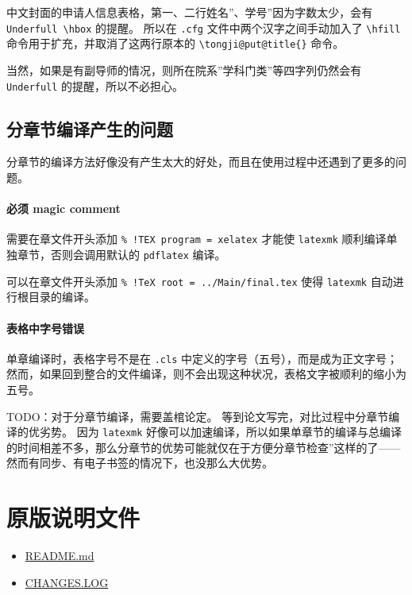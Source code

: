 \documentclass[../Main/thesis.tex]{subfiles}
\begin{document}
中文封面的申请人信息表格，第一、二行姓名''、学号''因为字数太少，会有
\texttt{Underfull\ \textbackslash{}hbox} 的提醒。 所以在 \texttt{.cfg}
文件中两个汉字之间手动加入了 \texttt{\textbackslash{}hfill}
命令用于扩充，并取消了这两行原本的
\texttt{\textbackslash{}tongji@put@title\{\}} 命令。

当然，如果是有副导师的情况，则所在院系''学科门类''等四字列仍然会有 \texttt{Underfull} 的提醒，所以不必担心。

\subsection{分章节编译产生的问题}

分章节的编译方法好像没有产生太大的好处，而且在使用过程中还遇到了更多的问题。

\paragraph{必须 magic comment}

需要在章文件开头添加 \texttt{\%\ !TEX\ program\ =\ xelatex} 才能使
\texttt{latexmk} 顺利编译单独章节，否则会调用默认的 \texttt{pdflatex}
编译。

可以在章文件开头添加 \texttt{\%\ !TeX\ root\ =\ ../Main/final.tex}
使得 \texttt{latexmk} 自动进行根目录的编译。

\paragraph{表格中字号错误}

单章编译时，表格字号不是在 \texttt{.cls}
中定义的字号（五号），而是成为正文字号；
然而，如果回到整合的文件编译，则不会出现这种状况，表格文字被顺利的缩小为五号。

TODO：对于分章节编译，需要盖棺论定。
等到论文写完，对比过程中分章节编译的优劣势。 因为 \texttt{latexmk}
好像可以加速编译，所以如果单章节的编译与总编译的时间相差不多，那么分章节的优势可能就仅在于方便分章节检查''这样的了------然而有同步、有电子书签的情况下，也没那么大优势。

\section{原版说明文件}

\begin{itemize}
\item
  \href{https://github.com/marquistj13/TongjiThesis/blob/master/README.md}{README.md}
\item
  \href{https://github.com/marquistj13/TongjiThesis/blob/master/changes.md}{CHANGES.LOG}
\end{itemize}
\end{document}
